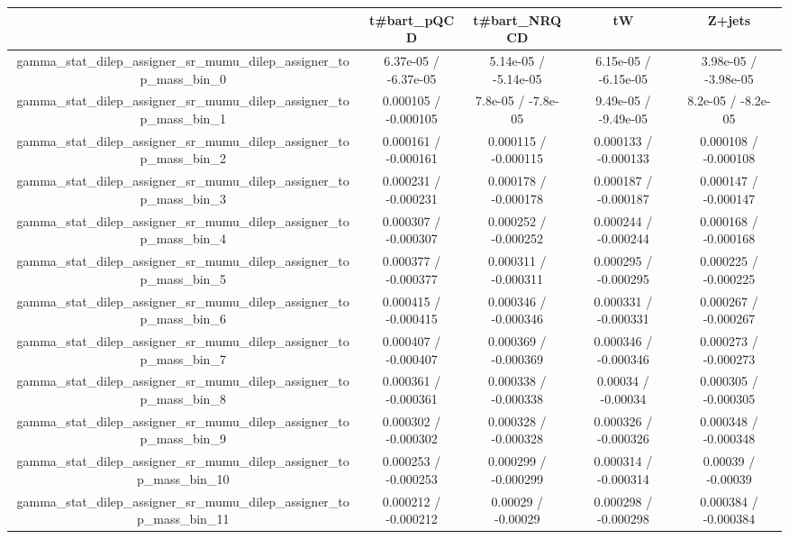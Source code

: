 \documentclass[10pt]{article}
\begin{document}
\begin{table}[htbp]
\begin{center}
\begin{tabular}{|c|c|c|c|c|}
\hline 
      & t#bar{t}_{pQCD}      & t#bar{t}_{NRQCD}      & tW      & Z+jets \\ 
\hline 
  gamma_stat_dilep_assigner_sr_mumu_dilep_assigner_top_mass_bin_0 & 6.37e-05 / -6.37e-05 & 5.14e-05 / -5.14e-05 & 6.15e-05 / -6.15e-05 & 3.98e-05 / -3.98e-05 \\ 
  gamma_stat_dilep_assigner_sr_mumu_dilep_assigner_top_mass_bin_1 & 0.000105 / -0.000105 & 7.8e-05 / -7.8e-05 & 9.49e-05 / -9.49e-05 & 8.2e-05 / -8.2e-05 \\ 
  gamma_stat_dilep_assigner_sr_mumu_dilep_assigner_top_mass_bin_2 & 0.000161 / -0.000161 & 0.000115 / -0.000115 & 0.000133 / -0.000133 & 0.000108 / -0.000108 \\ 
  gamma_stat_dilep_assigner_sr_mumu_dilep_assigner_top_mass_bin_3 & 0.000231 / -0.000231 & 0.000178 / -0.000178 & 0.000187 / -0.000187 & 0.000147 / -0.000147 \\ 
  gamma_stat_dilep_assigner_sr_mumu_dilep_assigner_top_mass_bin_4 & 0.000307 / -0.000307 & 0.000252 / -0.000252 & 0.000244 / -0.000244 & 0.000168 / -0.000168 \\ 
  gamma_stat_dilep_assigner_sr_mumu_dilep_assigner_top_mass_bin_5 & 0.000377 / -0.000377 & 0.000311 / -0.000311 & 0.000295 / -0.000295 & 0.000225 / -0.000225 \\ 
  gamma_stat_dilep_assigner_sr_mumu_dilep_assigner_top_mass_bin_6 & 0.000415 / -0.000415 & 0.000346 / -0.000346 & 0.000331 / -0.000331 & 0.000267 / -0.000267 \\ 
  gamma_stat_dilep_assigner_sr_mumu_dilep_assigner_top_mass_bin_7 & 0.000407 / -0.000407 & 0.000369 / -0.000369 & 0.000346 / -0.000346 & 0.000273 / -0.000273 \\ 
  gamma_stat_dilep_assigner_sr_mumu_dilep_assigner_top_mass_bin_8 & 0.000361 / -0.000361 & 0.000338 / -0.000338 & 0.00034 / -0.00034 & 0.000305 / -0.000305 \\ 
  gamma_stat_dilep_assigner_sr_mumu_dilep_assigner_top_mass_bin_9 & 0.000302 / -0.000302 & 0.000328 / -0.000328 & 0.000326 / -0.000326 & 0.000348 / -0.000348 \\ 
  gamma_stat_dilep_assigner_sr_mumu_dilep_assigner_top_mass_bin_10 & 0.000253 / -0.000253 & 0.000299 / -0.000299 & 0.000314 / -0.000314 & 0.00039 / -0.00039 \\ 
  gamma_stat_dilep_assigner_sr_mumu_dilep_assigner_top_mass_bin_11 & 0.000212 / -0.000212 & 0.00029 / -0.00029 & 0.000298 / -0.000298 & 0.000384 / -0.000384 \\ 

\end{tabular}
\end{center}
\end{table}
\end{document}
